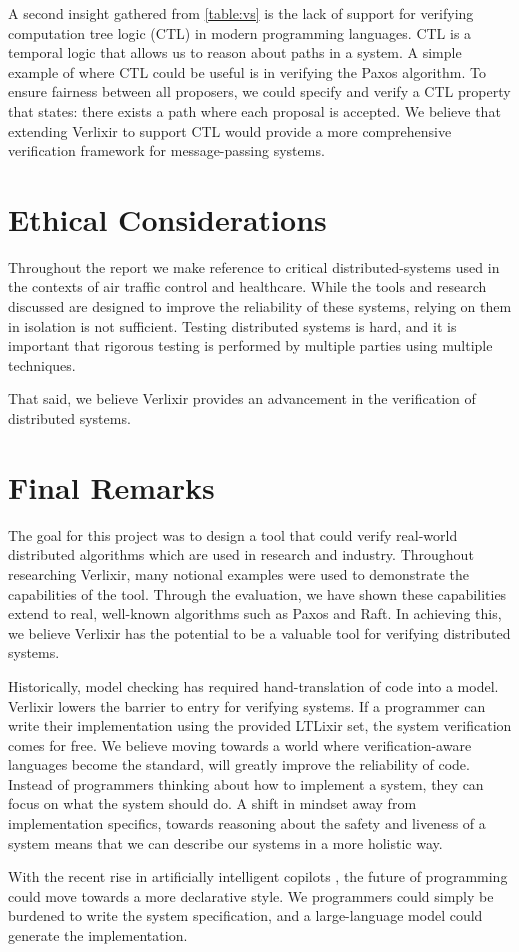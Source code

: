 \par
A second insight gathered from \ref{table:vs} is the lack of support for verifying computation tree logic (CTL) in modern programming languages. CTL is a temporal logic that allows us to reason about paths in a system. A simple example of where CTL could be useful is in verifying the Paxos algorithm. To ensure fairness between all proposers, we could specify and verify a CTL property that states: there exists a path where each proposal is accepted. We believe that extending Verlixir to support CTL would provide a more comprehensive verification framework for message-passing systems.
\section{Ethical Considerations}
Throughout the report we make reference to critical distributed-systems used in the contexts of air traffic control and healthcare. While the tools and research discussed are designed to improve the reliability of these systems, relying on them in isolation is not sufficient. Testing distributed systems is hard, and it is important that rigorous testing is performed by multiple parties using multiple techniques.
\par
That said, we believe Verlixir provides an advancement in the verification of distributed systems.
\section{Final Remarks}
The goal for this project was to design a tool that could verify real-world distributed algorithms which are used in research and industry. Throughout researching Verlixir, many notional examples were used to demonstrate the capabilities of the tool. Through the evaluation, we have shown these capabilities extend to real, well-known algorithms such as Paxos and Raft. In achieving this, we believe Verlixir has the potential to be a valuable tool for verifying distributed systems.
\par
Historically, model checking has required hand-translation of code into a model. Verlixir lowers the barrier to entry for verifying systems. If a programmer can write their implementation using the provided LTLixir set, the system verification comes for free. We believe moving towards a world where verification-aware languages become the standard, will greatly improve the reliability of code. Instead of programmers thinking about how to implement a system, they can focus on what the system should do. A shift in mindset away from implementation specifics, towards reasoning about the safety and liveness of a system means that we can describe our systems in a more holistic way.
\par
With the recent rise in artificially intelligent copilots \cite{attention_is, copilot_asset,safety_ai}, the future of programming could move towards a more declarative style. We programmers could simply be burdened to write the system specification, and a large-language model could generate the implementation.